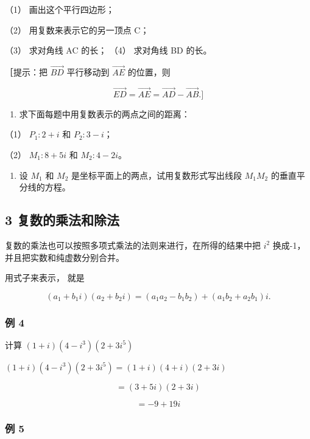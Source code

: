 （1） 画出这个平行四边形；

（2） 用复数来表示它的另一顶点 C；

（3） 求对角线 AC 的长； （4） 求对角线 BD 的长。

［提示：把 \(\overrightarrow{BD}\) 平行移动到 \(\overrightarrow{AE}\)
的位置，则

\[
\overrightarrow {E D} = \overrightarrow {A E} = \overrightarrow {A D} - \overrightarrow {A B}. ]
\]

\begin{enumerate}[start=3]
\item
  求下面每题中用复数表示的两点之间的距离：
\end{enumerate}

（1） \(P_{1}: 2 + i\) 和 \(P_{2}: 3 - i\)；

（2） \(M_{1}: 8 + 5i\) 和 \(M_{2}: 4 - 2i\)。

\begin{enumerate}[start=4,label={*\arabic*.}]
\item
  设 \(M_{1}\) 和 \(M_{2}\) 是坐标平面上的两点，试用复数形式写出线段
\(M_{1}M_{2}\) 的垂直平分线的方程。

\end{enumerate}
\subsection{3 复数的乘法和除法}

复数的乘法也可以按照多项式乘法的法则来进行，在所得的结果中把 \(i^{2}\)
换成-1，并且把实数和纯虚数分别合并。

用式子来表示， 就是

\[
\left(a _ {1} + b _ {1} i\right) \left(a _ {2} + b _ {2} i\right) = \left(a _ {1} a _ {2} - b _ {1} b _ {2}\right) + \left(a _ {1} b _ {2} + a _ {2} b _ {1}\right) i.
\]

\subsubsection{例 4}

计算 \((1 + i)(4 - i^3)(2 + 3i^5)\)

 \((1 + i)(4 - i^3)(2 + 3i^5) = (1 + i)(4 + i)(2 + 3i)\)

\[
= (3 + 5 i) (2 + 3 i)
\]

\[
= - 9 + 19 i
\]

\subsubsection{例 5}

